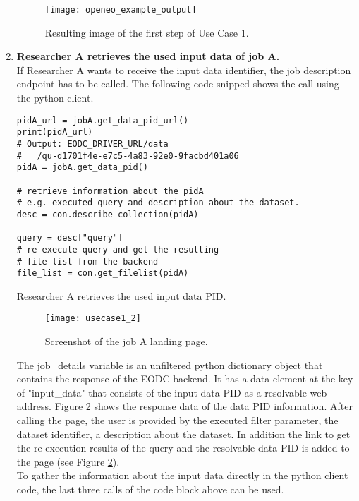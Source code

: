 \documentclass[draft,final]{vutinfth} %
\newenvironment{code}{\captionsetup{type=listing}}{}
\begin{document}
\begin{enumerate}
\begin{figure}[h]
	\centering
	\texttt{[image: openeo\_example\_output]}
	\caption{Resulting image of the first step of Use Case 1.}
	\label{fig:impl_usecase1_min} %
\end{figure}

	\item \textbf{Researcher A retrieves the used input data of job A.} \\
	If Researcher A wants to receive the input data identifier, the job description endpoint has to be called. The following code snipped shows the call using the python client.

\begin{code}
	\begin{verbatim}
pidA_url = jobA.get_data_pid_url()
print(pidA_url)
# Output: EODC_DRIVER_URL/data
#	/qu-d1701f4e-e7c5-4a83-92e0-9facbd401a06
pidA = jobA.get_data_pid()

# retrieve information about the pidA 
# e.g. executed query and description about the dataset.
desc = con.describe_collection(pidA)

query = desc["query"]
# re-execute query and get the resulting 
# file list from the backend
file_list = con.get_filelist(pidA)
	\end{verbatim}
	\caption{Researcher A retrieves the used input data PID.}
	\label{lst:impl_usecase1_2}
\end{code}
	
	\begin{figure}[h]
		\centering
		\texttt{[image: usecase1\_2]}
		\caption{Screenshot of the job A landing page.}
		\label{fig:usecase1-pid} %
	\end{figure}
	
	The job\_details variable is an unfiltered python dictionary object that contains the response of the EODC backend. It has a data element at the key of "input\_data" that consists of the input data PID as a resolvable web address. Figure \ref{fig:usecase1-pid} shows the response data of the data PID information. After calling the page, the user is provided by the executed filter parameter, the dataset identifier, a description about the dataset. In addition the link to get the re-execution results of the query and the resolvable data PID is added to the page (see Figure \ref{fig:usecase1-pid}). \\
	To gather the information about the input data directly in the python client code, the last three calls of the code block above can be used.  
	

\end{enumerate}
\end{document}
